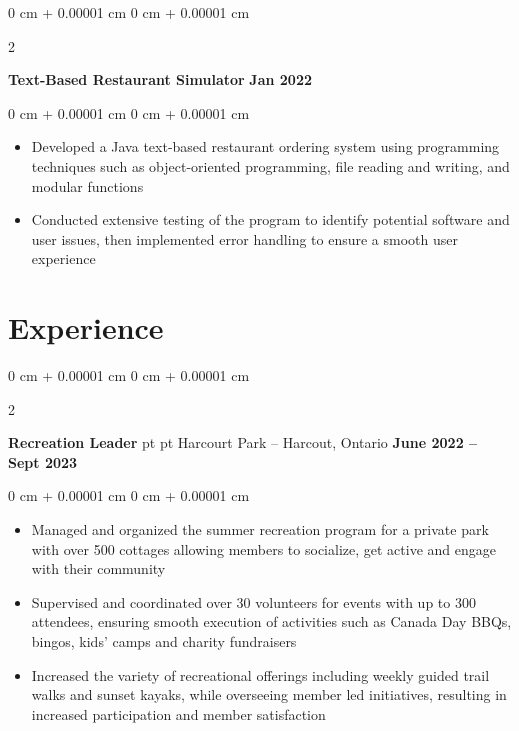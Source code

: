 \documentclass[10pt, letterpaper]{article}
\newenvironment{highlights}{
    \begin{itemize}[
        topsep=0.10 cm,
        parsep=0.10 cm,
        partopsep=0pt,
        itemsep=0pt,
        leftmargin=0 cm + 10pt
    ]
}{
    \end{itemize}
} %
\newenvironment{onecolentry}{
    \begin{adjustwidth}{
        0 cm + 0.00001 cm
    }{
        0 cm + 0.00001 cm
    }
}{
    \end{adjustwidth}
} %
\newenvironment{twocolentry}[2][]{
    \onecolentry
    \def\secondColumn{#2}
    \setcolumnwidth{\fill, 4.5 cm}
    \begin{paracol}{2}
}{
    \switchcolumn \raggedleft \secondColumn
    \end{paracol}
    \endonecolentry
} %
\begin{document}
        \vspace{0.2 cm}

        \begin{twocolentry}{
            \textbf{Jan 2022}
        }
            \textbf{Text-Based Restaurant Simulator}\end{twocolentry}

        \vspace{0.10 cm}
        \begin{onecolentry}
            \begin{highlights}
                \item Developed a Java text-based restaurant ordering system using programming techniques such as object-oriented programming, file reading and writing, and modular functions
                \item Conducted extensive testing of the program to identify potential software and user issues, then implemented error handling to ensure a smooth user experience 
            \end{highlights}
        \end{onecolentry}




    
    \section{Experience}



        
        \begin{twocolentry}{
            \textbf{June 2022 –  Sept 2023}
        }
            \textbf{Recreation Leader} pt\AND {} pt Harcourt Park -- Harcout, Ontario\end{twocolentry}

        \vspace{0.10 cm}
        \begin{onecolentry}
            \begin{highlights}
                \item Managed and organized the summer recreation program for a private park with over 500 cottages allowing members to socialize, get active and engage with their community
                \item Supervised and coordinated over 30 volunteers for events with up to 300 attendees, ensuring smooth execution of activities such as Canada Day BBQs, bingos, kids' camps and charity fundraisers
                \item Increased the variety of recreational offerings including weekly guided trail walks and sunset kayaks, while overseeing member led initiatives, resulting in increased participation and member satisfaction
            \end{highlights}
        \end{onecolentry}
\end{document}
